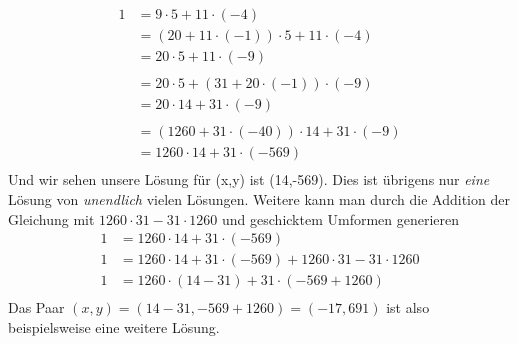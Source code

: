\documentclass[11pt]{article}
\begin{document}
\begin{enumerate}
\begin{align*}
            1 &= 9 \cdot 5 + 11 \cdot (-4)\\ 
              &= (20+11\cdot(-1))\cdot 5 + 11 \cdot (-4)\\
              &= 20 \cdot 5 + 11 \cdot (-9)\\
              ~\\
              &= 20 \cdot 5 + (31+20\cdot(-1)) \cdot (-9)\\
              &= 20 \cdot 14 + 31 \cdot (-9)\\
              ~\\
              &= (1260+31\cdot(-40)) \cdot 14 + 31 \cdot (-9)\\
              &= 1260 \cdot 14 + 31 \cdot (-569)\\
        \end{align*}
        Und wir sehen unsere L\"osung f\"ur (x,y) ist (14,-569). Dies ist \"ubrigens nur \textit{eine} L\"osung von \textit{unendlich} vielen L\"osungen. 
        Weitere kann man durch die Addition der Gleichung mit $1260\cdot31 - 31\cdot 1260$ und geschicktem Umformen generieren
        \begin{align*}
            1 &= 1260 \cdot 14 + 31 \cdot (-569)\\
            1 &= 1260 \cdot 14 + 31 \cdot (-569) + 1260\cdot31 - 31\cdot1260\\
            1 &= 1260 \cdot (14-31) + 31 \cdot (-569+1260)\\
        \end{align*}
        Das Paar $(x,y) = (14-31,-569+1260) = (-17, 691)$ ist also beispielsweise eine weitere L\"osung.
\end{enumerate}
\end{document}
